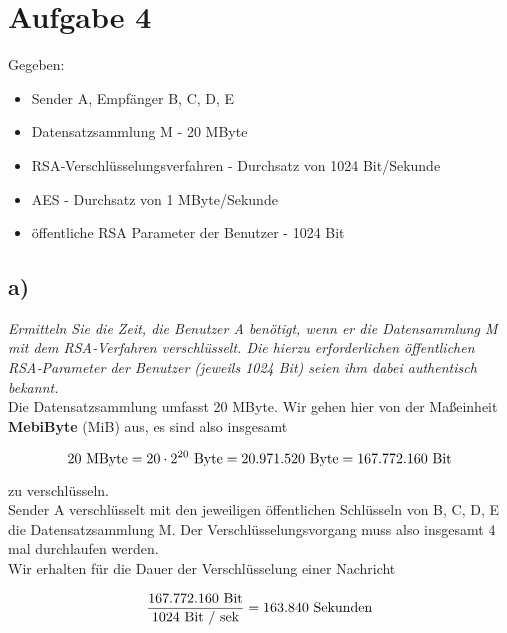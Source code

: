 \chapter{Aufgabe 4}

\noindent
Gegeben:

\begin{itemize}
    \item Sender A, Empfänger B, C, D, E
    \item Datensatzsammlung M - 20 MByte
    \item RSA‐Verschlüsselungsverfahren -  Durchsatz von 1024 Bit/Sekunde
    \item AES - Durchsatz von 1 MByte/Sekunde
    \item öffentliche RSA Parameter der Benutzer - 1024 Bit
\end{itemize}

\section{a)}
\textit{Ermitteln Sie die Zeit, die Benutzer A benötigt, wenn er die Datensammlung M
mit dem RSA‐Verfahren verschlüsselt. Die hierzu erforderlichen öffentlichen
RSA‐Parameter der Benutzer (jeweils 1024 Bit) seien ihm dabei authentisch
bekannt.}\\

\noindent
Die Datensatzsammlung umfasst 20 MByte.
Wir gehen hier von der Maßeinheit \textbf{MebiByte} (MiB) aus, es sind also insgesamt

\begin{equation}\notag
20 \ \text{MByte} = 20 \cdot 2^{20}\  \text{Byte} = 20.971.520\  \text{Byte} = 167.772.160\  \text{Bit}
\end{equation}

\noindent
zu verschlüsseln.\\

\noindent
Sender A verschlüsselt mit den jeweiligen öffentlichen Schlüsseln von B, C, D, E die Datensatzsammlung M.
Der Verschlüsselungsvorgang muss also insgesamt 4 mal durchlaufen werden. \\

\noindent
Wir erhalten für die Dauer der Verschlüsselung einer Nachricht

\begin{equation}\notag
\frac{167.772.160\ \text{Bit}}{1024\ \text{Bit / sek}} = 163.840\ \text{Sekunden}
\end{equation}

\vspace{2mm}

